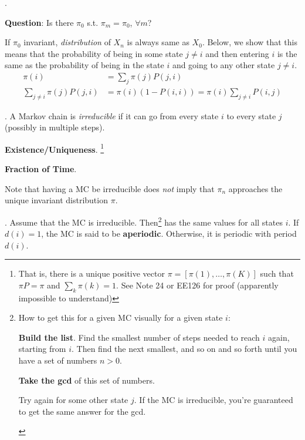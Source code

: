 \documentclass[12pt]{article}
\newcommand{\myspace}{\vspace{2\bigskipamount}}
\newcommand\p{\Needspace{12\baselineskip} \noindent}
\begin{document}
\myspace
\p {}. 
\begin{compactitem}
	\item \textbf{Question}: Is there $\pi_0$ s.t. $\pi_m = \pi_0$, $\forall m$? 
	\item \Theorem[A distribution $\pi_0$ is invariant iff $\pi_0 P = \pi_0$]  
\end{compactitem}
If $\pi_0$ invariant, \emph{distribution} of $X_n$ is always same as $X_0$. Below, we show that this means that the probability of being in some state $j \ne i$ and then entering $i$ is the same as the probability of being in the state $i$ and going to any other state $j \ne i$. 
\begin{align}
	\pi(i) &= \sum_{j} \pi(j) P(j, i) \\
	\sum_{j \ne i} \pi(j) P(j, i) &= \pi(i)(1 - P(i, i)) = \pi(i)\sum_{j \ne i} P(i, j)
\end{align}

\myspace
\p {}. A Markov chain is \textit{irreducible} if it can go from every state $i$ to every state $j$ (possibly in multiple steps). 
\begin{compactitem}[$\rightarrow$]
	\item \textbf{Existence/Uniqueness}. \footnote{That is, there is a unique positive vector $\pi = [\pi(1), \ldots, \pi(K)]$ such that $\pi P = \pi$ and $\sum_k \pi(k) = 1$. See Note 24 or EE126 for proof (apparently impossible to understand)}
	
	\item \textbf{Fraction of Time}. 
\end{compactitem}
Note that having a MC be irreducible does \textit{not} imply that $\pi_n$ approaches the unique invariant distribution $\pi$. 

\myspace
\p {}. Assume that the MC is irreducible. Then\footnote{How to get this for a given MC visually for a given state $i$: \begin{compactitem}
		\item \textbf{Build the list}. Find the smallest number of steps needed to reach $i$ again, starting from $i$. Then find the next smallest, and so on and so forth until you have a set of numbers $n > 0$. 
		\item \textbf{Take the gcd} of this set of numbers. 
		\item Try again for some other state $j$. If the MC is irreducible, you're guaranteed to get the same answer for the gcd.
	\end{compactitem}}
has the same values for all states $i$. If $d(i) = 1$, the MC is said to be \textbf{aperiodic}. Otherwise, it is periodic with period $d(i)$. 
	
\end{document}
